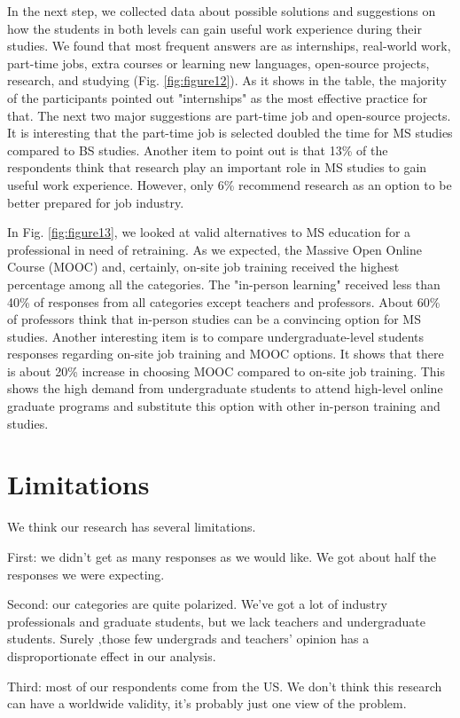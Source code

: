 \documentclass{sigchi}
\begin{document}
In the next step, we collected data about possible solutions and suggestions on how the students in both levels can gain useful work experience during their studies. We found that most frequent answers are as internships, real-world work, part-time jobs, extra courses or learning new languages, open-source projects, research, and studying (Fig. \ref{fig:figure12}). As it shows in the table, the majority of the participants pointed out "internships" as the most effective practice for that. The next two major suggestions are part-time job and open-source projects. It is interesting that the part-time job is selected doubled the time for MS studies compared to BS studies. Another item to point out is that 13\% of the respondents think that research play an important role in MS studies to gain useful work experience. However, only 6\% recommend research as an option to be better prepared for job industry.

In Fig. \ref{fig:figure13}, we looked at valid alternatives to MS education for a professional in need of retraining. As we expected, the Massive Open Online Course (MOOC) and, certainly, on-site job training received the highest percentage among all the categories. The "in-person learning" received less than 40\% of responses from all categories except teachers and professors. About 60\% of professors think that in-person studies can be a convincing option for MS studies. Another interesting item is to compare undergraduate-level students responses regarding on-site job training and MOOC options. It shows that there is about 20\% increase in choosing MOOC compared to on-site job training. This shows the high demand from undergraduate students to attend high-level online graduate programs and substitute this option with other in-person training and studies.

\section{Limitations}
 We think our research has several limitations.

First: we didn't get as many responses as we would like. We got about half the responses we were expecting.

Second: our categories are quite polarized. We've got a lot of industry professionals and graduate students, but we lack teachers and undergraduate students. Surely ,those few undergrads and teachers' opinion has a disproportionate effect in our analysis.

Third: most of our respondents come from the US. We don't think this research can have a worldwide validity, it's probably just one view of the problem.
\end{document}
